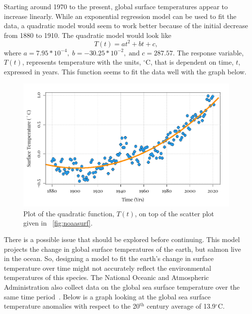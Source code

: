 Starting around 1970 to the present, global surface temperatures appear to increase linearly.
While an exponential regression model can be used to fit the data, a quadratic model would seem to work better because of the initial decrease from 1880 to 1910.
The quadratic model would look like
\begin{equation}\label{eq:SSTmodel}
    T(t) = at^2 + bt + c,
\end{equation}
where $a=7.95*10^{-4},\; b=-30.25*10^{-2},\;\text{and } c=287.57$. The response variable, $T(t)$, represents temperature with the units, $^{\circ}$C, that is dependent on time, $t$, expressed in years.
This function seems to fit the data well with the graph below.
\begin{figure}[H]
    \centering
    \includegraphics[width=14cm]{Pictures/SST/Global Temp Fit.png}
    \caption{\singlespacing
    Plot of the quadratic function, $T(t)$, on top of the scatter plot given in \figureautorefname~\ref{fig:noaasurf}.}
    \label{fig:polyfitsurf}
\end{figure}
There is a possible issue that should be explored before continuing.
This model projects the change in global  surface temperatures of the earth, but salmon live in the ocean. 
So, designing a model to fit the earth's change in surface temperature over time might not accurately reflect the environmental temperatures of this species.
The National Oceanic and Atmospheric Administration also collect data on the global sea surface temperature over the same time period~\cite{NOAA}.
Below is a graph looking at the global sea surface temperature anomalies with respect to the 20$^{\text{th}}$ century average of 13.9$^{\circ}$C.
